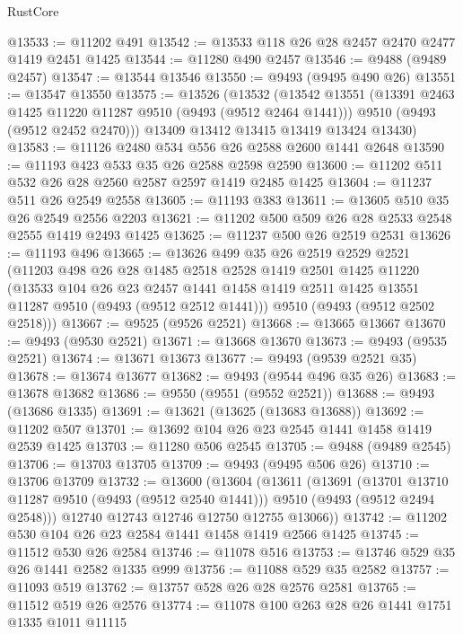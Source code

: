 \begin{lexlean}{RustCore}
\begin{coremodule}
@13533 := @11202 @491
@13542 := @13533 @118 @26 @28 @2457 @2470 @2477 @1419 @2451 @1425
@13544 := @11280 @490 @2457
@13546 := @9488 (@9489 @2457)
@13547 := @13544 @13546
@13550 := @9493 (@9495 @490 @26)
@13551 := @13547 @13550
@13575 := @13526
    (@13532
      (@13542
        @13551
        (@13391 @2463 @1425 @11220 @11287 @9510 (@9493 (@9512 @2464 @1441)))
        @9510
        (@9493 (@9512 @2452 @2470)))
      @13409
      @13412
      @13415
      @13419
      @13424
      @13430)
@13583 := @11126 @2480 @534 @556 @26 @2588 @2600 @1441 @2648
@13590 := @11193 @423 @533 @35 @26 @2588 @2598 @2590
@13600 := @11202 @511 @532 @26 @28 @2560 @2587 @2597 @1419 @2485 @1425
@13604 := @11237 @511 @26 @2549 @2558
@13605 := @11193 @383
@13611 := @13605 @510 @35 @26 @2549 @2556 @2203
@13621 := @11202 @500 @509 @26 @28 @2533 @2548 @2555 @1419 @2493 @1425
@13625 := @11237 @500 @26 @2519 @2531
@13626 := @11193 @496
@13665 := @13626
    @499
    @35
    @26
    @2519
    @2529
    @2521
    (@11203
      @498
      @26
      @28
      @1485
      @2518
      @2528
      @1419
      @2501
      @1425
      @11220
      (@13533
        @104
        @26
        @23
        @2457
        @1441
        @1458
        @1419
        @2511
        @1425
        @13551
        @11287
        @9510
        (@9493 (@9512 @2512 @1441)))
      @9510
      (@9493 (@9512 @2502 @2518)))
@13667 := @9525 (@9526 @2521)
@13668 := @13665 @13667
@13670 := @9493 (@9530 @2521)
@13671 := @13668 @13670
@13673 := @9493 (@9535 @2521)
@13674 := @13671 @13673
@13677 := @9493 (@9539 @2521 @35)
@13678 := @13674 @13677
@13682 := @9493 (@9544 @496 @35 @26)
@13683 := @13678 @13682
@13686 := @9550 (@9551 (@9552 @2521))
@13688 := @9493 (@13686 @1335)
@13691 := @13621 (@13625 (@13683 @13688))
@13692 := @11202 @507
@13701 := @13692 @104 @26 @23 @2545 @1441 @1458 @1419 @2539 @1425
@13703 := @11280 @506 @2545
@13705 := @9488 (@9489 @2545)
@13706 := @13703 @13705
@13709 := @9493 (@9495 @506 @26)
@13710 := @13706 @13709
@13732 := @13600
    (@13604
      (@13611
        (@13691
          (@13701 @13710 @11287 @9510 (@9493 (@9512 @2540 @1441)))
          @9510
          (@9493 (@9512 @2494 @2548)))
        @12740
        @12743
        @12746
        @12750
        @12755
        @13066))
@13742 := @11202 @530 @104 @26 @23 @2584 @1441 @1458 @1419 @2566 @1425
@13745 := @11512 @530 @26 @2584
@13746 := @11078 @516
@13753 := @13746 @529 @35 @26 @1441 @2582 @1335 @999
@13756 := @11088 @529 @35 @2582
@13757 := @11093 @519
@13762 := @13757 @528 @26 @28 @2576 @2581
@13765 := @11512 @519 @26 @2576
@13774 := @11078 @100 @263 @28 @26 @1441 @1751 @1335 @1011 @11115

\end{coremodule}
\end{lexlean}
